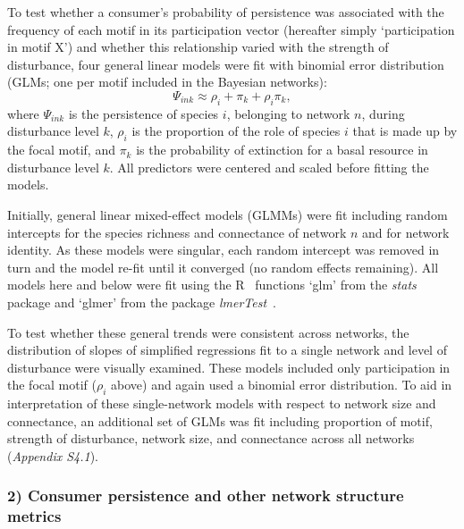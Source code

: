 \documentclass[12pt]{article}
\begin{document}
\begin{spacing}{1.0}
            To test whether a consumer's probability of persistence was associated with the frequency of each motif in its participation vector (hereafter simply `participation in motif X') and whether this relationship varied with the strength of disturbance, four general linear models were fit with binomial error distribution (GLMs; one per motif included in the Bayesian networks):
            \begin{equation}
            \Psi_{ink} \approx \rho_{i} + \pi_{k} + \rho_{i}\pi_{k} ,
            \label{propreq}
            \end{equation}
            \noindent where $\Psi_{ink}$ is the persistence of species $i$, belonging to network $n$, during disturbance level $k$, $\rho_{i}$ is the proportion of the role of species $i$ that is made up by the focal motif, and $\pi_k$ is the probability of extinction for a basal resource in disturbance level $k$.
            All predictors were centered and scaled before fitting the models.
            
      
            Initially, general linear mixed-effect models (GLMMs) were fit including random  intercepts for the species richness and connectance of network $n$ and for network identity.
            As these models were singular, each random intercept was removed in turn and the model re-fit until it converged (no random effects remaining).
            All models here and below were fit using the R~\citep{R} functions `glm' from the \emph{stats} package and `glmer' from the package \emph{lmerTest}~\citep{lmerTest}.
            
            
            To test whether these general trends were consistent across networks, the distribution of slopes of simplified regressions fit to a single network and level of disturbance were visually examined.
            These models included only participation in the focal motif ($\rho_{i}$ above) and again used a binomial error distribution.
            To aid in interpretation of these single-network models with respect to network size and connectance, an additional set of GLMs was fit including proportion of motif, strength of disturbance, network size, and connectance across all networks (\emph{Appendix S4.1}).



        \subsubsection*{2) Consumer persistence and other network structure metrics}


\end{spacing}
\end{document}
